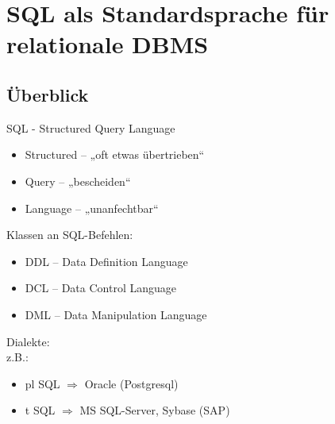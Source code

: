 \section{SQL als Standardsprache für relationale DBMS}
\subsection{Überblick}
SQL - Structured Query Language
\begin{itemize}
\item Structured -- „oft etwas übertrieben“
\item Query -- „bescheiden“
\item Language -- „unanfechtbar“
\end{itemize}
Klassen an SQL-Befehlen:
\begin{itemize}
\item DDL -- Data Definition Language
\item DCL -- Data Control Language
\item DML -- Data Manipulation Language
\end{itemize}
Dialekte:\\
z.B.:
\begin{itemize}
\item pl SQL $\Rightarrow$ Oracle (Postgresql)
\item t SQL $\Rightarrow$ MS SQL-Server, Sybase (SAP)
\end{itemize}
